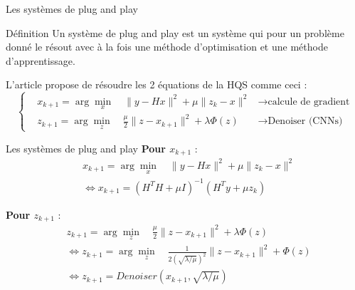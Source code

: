 \documentclass[11pt]{beamer}
\begin{document}
\begin{frame}{Les systèmes de plug and play}
    \begin{exampleblock}{Définition}
        Un système de plug and play est un système qui pour un problème donné le résout
        avec à la fois une méthode d'optimisation et une méthode d'apprentissage.
    \end{exampleblock}

    L'article propose de résoudre les 2 équations de la HQS comme ceci :
    \begin{equation*}
        \left\{
        \begin{aligned}
            & x_{k+1} = \arg \min_x \quad \lVert y - Hx \rVert^2 + \mu \lVert z_k - x \rVert^2 &  \rightarrow \text{calcule de gradient}\\
            & z_{k+1} = \arg \min_z \quad \frac{\mu}{2}\lVert z - x_{k+1} \rVert^2 + \lambda \Phi(z) & \rightarrow \text{Denoiser (CNNs)}
        \end{aligned}
        \right.
    \end{equation*}
\end{frame}


\begin{frame}{Les systèmes de plug and play}
    \textbf{Pour $x_{k+1}$} :
    \begin{align*}
        & x_{k+1} = \arg \min_x \quad \lVert y - Hx \rVert ^2 + \mu \lVert z_k - x \rVert ^2 \\
        & \Leftrightarrow x_{k+1} = (H^TH + \mu I)^{-1} (H^Ty + \mu z_k)
    \end{align*}

    \textbf{Pour $z_{k+1}$} :
    \begin{align*}
        & z_{k+1} = \arg \min_z \quad \frac{\mu}{2}\lVert z - x_{k+1} \rVert^2 + \lambda \Phi(z) \\
        & \Leftrightarrow z_{k+1} = \arg \min_z \quad \frac{1}{2 (\sqrt{\lambda / \mu}) ^2}\lVert z - x_{k+1} \rVert^2 + \Phi(z) \\
        & \Leftrightarrow z_{k+1} = Denoiser(x_{k+1}, \sqrt{\lambda / \mu})
    \end{align*}
\end{frame}
\end{document}
